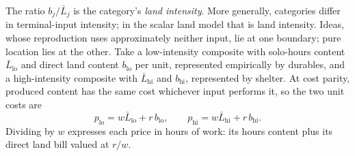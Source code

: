 \documentclass[12pt]{article}
\theoremstyle{plain}
\newcommand{\lo}{\mathrm{lo}}
\newcommand{\hi}{\mathrm{hi}}
\begin{document}
The ratio $b_j/\bar{L}_j$ is the category's \emph{land intensity}. More generally, categories differ in terminal-input intensity; in the scalar land model that is land intensity. Ideas, whose reproduction uses approximately neither input, lie at one boundary; pure location lies at the other. Take a low-intensity composite with solo-hours content $\bar{L}_{\lo}$ and direct land content $b_{\lo}$ per unit, represented empirically by durables, and a high-intensity composite with $\bar{L}_{\hi}$ and $b_{\hi}$, represented by shelter. At cost parity, produced content has the same cost whichever input performs it, so the two unit costs are
\begin{equation}\label{eq:composites}
p_{\lo} = w\bar{L}_{\lo} + r\, b_{\lo},
\qquad
p_{\hi} = w\bar{L}_{\hi} + r\, b_{\hi}.
\end{equation}
Dividing by $w$ expresses each price in hours of work: its hours content plus its direct land bill valued at $r/w$.
\end{document}
